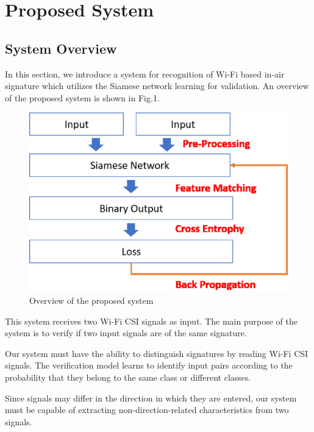 \documentclass[runningheads]{llncs}
\begin{document}
\section{Proposed System}

\subsection{System Overview}


In this section, we introduce a system for recognition of Wi-Fi based in-air signature which utilizes the Siamese network learning for validation.
An overview of the proposed system is shown in Fig.1.
\begin{figure}
    \includegraphics[width=\textwidth]{methods1.eps}
    \caption{Overview of the proposed system} \label{method1}
\end{figure}

This system receives two Wi-Fi CSI signals as input.
The main purpose of the system is to verify if two input signals are of the same signature.

Our system must have the ability to distinguish signatures by reading Wi-Fi CSI signals.
The verification model learns to identify input pairs according to the probability that they belong to the same class or different classes.\cite{koch2015siamese}

Since signals may differ in the direction in which they are entered, our system must be capable of extracting non-direction-related characteristics from two signals.
\end{document}
